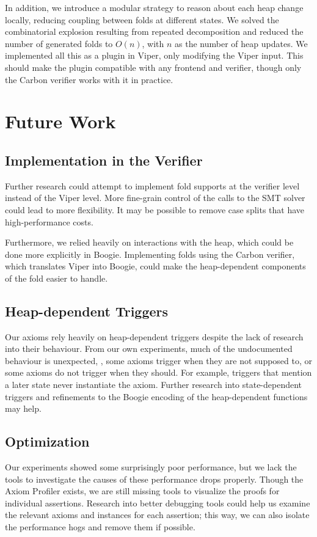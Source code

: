\documentclass[msc,oneside]{ubcthesis}
\theoremstyle{definition}
\begin{document}
In addition, we introduce a modular strategy to reason about each heap change locally, reducing coupling between folds at different states. We solved the combinatorial explosion resulting from repeated decomposition and reduced the number of generated folds to $O(n)$, with $n$ as the number of heap updates. We implemented all this as a plugin in Viper, only modifying the Viper input. This should make the plugin compatible with any frontend and verifier, though only the Carbon verifier works with it in practice.


\section{Future Work}
\subsection{Implementation in the Verifier}
Further research could attempt to implement fold supports at the verifier level instead of the Viper level. More fine-grain control of the calls to the SMT solver could lead to more flexibility. It may be possible to remove case splits that have high-performance costs.

Furthermore, we relied heavily on interactions with the heap, which could be done more explicitly in Boogie. Implementing folds using the Carbon verifier, which translates Viper into Boogie, could make the heap-dependent components of the fold easier to handle. 

\subsection{Heap-dependent Triggers}
Our axioms rely heavily on heap-dependent triggers despite the lack of research into their behaviour. From our own experiments, much of the undocumented behaviour is unexpected, \ie, some axioms trigger when they are not supposed to, or some axioms do not trigger when they should. For example, triggers that mention a later state never instantiate the axiom. Further research into state-dependent triggers and refinements to the Boogie encoding of the heap-dependent functions may help. 


\subsection{Optimization}
Our experiments showed some surprisingly poor performance, but we lack the tools to investigate the causes of these performance drops properly. Though the Axiom Profiler exists, we are still missing tools to visualize the proofs for individual assertions. Research into better debugging tools could help us examine the relevant axioms and instances for each assertion; this way, we can also isolate the performance hogs and remove them if possible.
\end{document}
